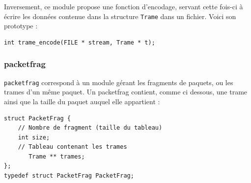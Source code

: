 \documentclass[a4paper,11pt]{article}
\begin{document}

Inversement, ce module propose une fonction d'encodage, servant cette
fois-ci à écrire les données contenue dans la structure \texttt{Trame}
dans un fichier. Voici son prototype :
\begin{verbatim}
int trame_encode(FILE * stream, Trame * t);
\end{verbatim}


\subsubsection{packetfrag}
\texttt{packetfrag} correspond à un module gérant les fragments de paquets, ou les trames d'un même paquet. Un packetfrag contient, comme ci dessous, une trame ainsi que la taille du paquet auquel elle appartient :\begin{verbatim}
struct PacketFrag {
    // Nombre de fragment (taille du tableau)
    int size;
    // Tableau contenant les trames
       Trame ** trames;
};
typedef struct PacketFrag PacketFrag;
\end{verbatim}
\end{document}
